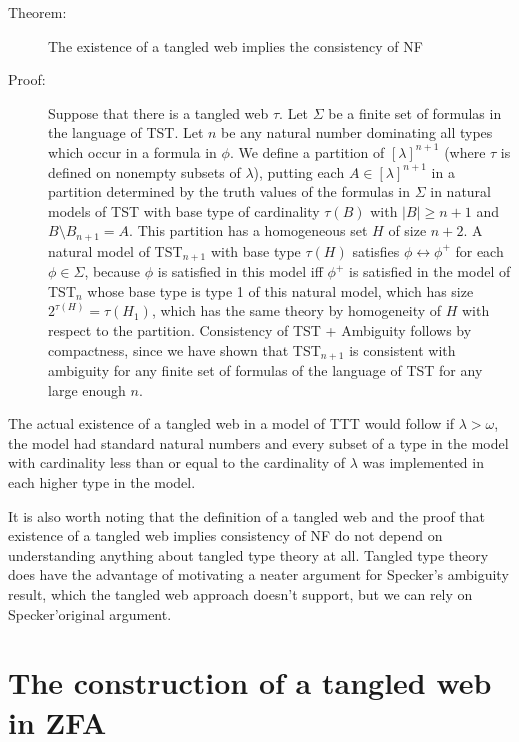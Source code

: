 \documentclass[12pt]{article}
\begin{document}
\begin{description}

\item[Theorem:]  The existence of a tangled web implies the consistency of NF

\item[Proof:]  Suppose that there is a tangled web $\tau$.  Let $\Sigma$ be a finite set of formulas in the language of TST.  Let $n$ be any natural number dominating all types which occur
in a formula in $\phi$.  We define a partition of $[\lambda]^{n+1}$ (where $\tau$ is defined on nonempty subsets of $\lambda$), putting each $A \in [\lambda]^{n+1}$ in a partition
determined by the truth values of the formulas in $\Sigma$ in natural models of TST with base type of cardinality $\tau(B)$ with $|B| \geq n+1$ and $B \setminus B_{n+1}=A$.  This partition has a homogeneous set $H$ of size $n+2$.  A natural model of TST$_{n+1}$ with base type $\tau(H)$ satisfies $\phi \leftrightarrow \phi^+$ for each $\phi \in \Sigma$, because
$\phi$ is satisfied in this model iff $\phi^+$ is satisfied in the model  of TST$_n$ whose base type is type 1 of this natural model, which has size $2^{\tau(H)} = \tau(H_1)$, which has the same theory by homogeneity of $H$ with respect to the partition.  Consistency of TST + Ambiguity follows by compactness, since we have shown that TST$_{n+1}$ is consistent with ambiguity for any finite set of formulas of the language of TST for any large enough $n$.

\end{description}

The actual existence of a tangled web in a model of TTT would follow if $\lambda>\omega$, the model had standard natural numbers and every subset of a type in the model with cardinality less than or equal to the cardinality of $\lambda$  was implemented in each higher type in the model.

It is also worth noting that the definition of a tangled web and the proof that existence of a tangled web implies consistency of NF do not depend on understanding anything about tangled type theory at all.  Tangled type theory does have the advantage of motivating a neater argument for Specker's ambiguity result, which the tangled web approach doesn't support, but we can rely on Specker'original argument.

\newpage

\section{The construction of a tangled web in ZFA}
\end{document}
